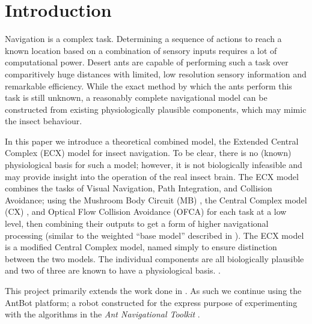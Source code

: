 \documentclass[a4paper,11pt,twoside,openright]{article}
\let\oldsection\section
\def\section{\cleardoublepage\oldsection}
\begin{document}

\raggedright

\section{ Introduction }
Navigation is a complex task. Determining a sequence of actions to reach a
known location based on a combination of sensory inputs requires a lot of
computational power. Desert ants are capable of performing such a task
over comparitively huge distances with limited, low resolution sensory
information and remarkable efficiency. While the exact method by which
the ants perform this task is still unknown, a reasonably complete navigational
model can be constructed from existing physiologically plausible components,
which may mimic the insect behaviour.
\newline
\par

In this paper we introduce a theoretical combined model, the Extended
Central Complex (ECX) model for insect navigation. To be clear, there
is no (known) physiological basis for such a model; however, it is not
biologically infeasible and may provide insight into the operation of
the real insect brain. The ECX model combines the tasks of Visual
Navigation, Path Integration, and Collision Avoidance; using the
Mushroom Body Circuit (MB) \cite{Ardin2016}, the Central Complex model
(CX) \cite{Stone2017}, and Optical Flow Collision Avoidance (OFCA)
\cite{Mitchell2018, Stewart2010} for each task at a low level, then
combining their outputs to get a form of higher navigational
processing (similar to the weighted ``base model'' described in
\cite{Webb2019}).  The ECX model is a modified Central Complex model,
named simply to ensure distinction between the two models. The
individual components are all biologically plausible and two of three
are known to have a physiological basis. \cite{Ardin2016, Stone2017,
  Mitchell2018, Stewart2010, Julien2017}.
\newline
\par

This project primarily extends the work done in
\cite{Mitchell2018}. As such we continue using the AntBot platform; a
robot constructed for the express purpose of experimenting with the
algorithms in the \textit{Ant Navigational Toolkit}
\cite{Eberding2016, Wehner2009}.
\end{document}
